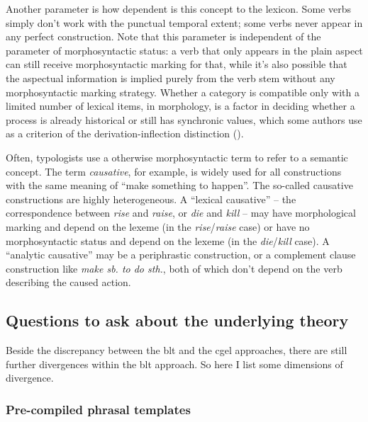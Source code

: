 \documentclass[UTF8, a4paper, oneside, scheme=plain]{ctexart}
\newcommand*{\term}[1]{\emph{#1}}
\newcommand*{\corpus}[1]{\emph{#1}}
\begin{document}
Another parameter is how dependent is this concept to the lexicon.
Some verbs simply don't work with the punctual temporal extent;
some verbs never appear in any perfect construction.
Note that this parameter is independent of the parameter of morphosyntactic status:
a verb that only appears in the plain aspect 
can still receive morphosyntactic marking for that,
while it's also possible that the aspectual information is implied purely from the verb stem 
without any morphosyntactic marking strategy.
Whether a category is compatible only with a limited number of lexical items,
in morphology, is a factor in deciding whether a process is 
already historical or still has synchronic values,
which some authors use as a criterion of the derivation-inflection distinction
().

Often, typologists use a otherwise morphosyntactic term to refer to a semantic concept.
The term \term{causative}, for example, 
is widely used for all constructions with the same meaning of ``make something to happen''.
The so-called causative constructions are highly heterogeneous.
A ``lexical causative'' -- the correspondence between \corpus{rise} and \corpus{raise},
or \corpus{die} and \corpus{kill} -- 
may have morphological marking and depend on the lexeme (in the \corpus{rise}/\corpus{raise} case)
or have no morphosyntactic status and depend on the lexeme (in the \corpus{die}/\corpus{kill} case).
A ``analytic causative'' 
may be a periphrastic construction, 
or a complement clause construction like \corpus{make sb. to do sth.},
both of which don't depend on the verb describing the caused action.

\subsection{Questions to ask about the underlying theory}

Beside the discrepancy between the \ac{blt} and the \ac{cgel} approaches,
there are still further divergences within the \ac{blt} approach.
So here I list some dimensions of divergence.

\subsubsection{Pre-compiled phrasal templates}
\end{document}
